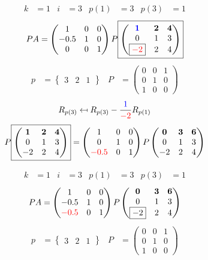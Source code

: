 \documentclass[pdf]{beamer}
\begin{document}
\begin{frame}{}\begin{align*} k &= 1 & i &= 3 & p(1) &= 3 & p(3) &= 1\end{align*} $$PA=\begin{pmatrix}1&0&0\\-0.5&1&0\\0&0&1\end{pmatrix} P \boxed{\begin{pmatrix}\mathbf{{\color{blue}1}}&\mathbf{2}&\mathbf{4}\\0&1&3\\\boxed{{\color{red}-2}}&2&4\end{pmatrix}} $$ \begin{align*} p&= \begin{Bmatrix}3&2&1\end{Bmatrix} & P&= \begin{pmatrix}0&0&1\\0&1&0\\1&0&0\end{pmatrix} \end{align*} $$R_{p(3)} \mapsfrom R_{p(3)} - \frac{{\color{blue}1}}{{\color{red}-2}} R_{p(1)}$$ $$ P \boxed{\begin{pmatrix}\mathbf{1}&\mathbf{2}&\mathbf{4}\\0&1&3\\-2&2&4\end{pmatrix}} = \begin{pmatrix}1&0&0\\0&1&0\\{\color{red}-0.5}&0&1\end{pmatrix} P \begin{pmatrix}\mathbf{0}&\mathbf{3}&\mathbf{6}\\0&1&3\\-2&2&4\end{pmatrix} $$\end{frame}
\begin{frame}{}\begin{align*} k &= 1 & i &= 3 & p(1) &= 3 & p(3) &= 1\end{align*}$$PA=\begin{pmatrix}1&0&0\\-0.5&1&0\\{\color{red}-0.5}&0&1\end{pmatrix} P \begin{pmatrix}\mathbf{0}&\mathbf{3}&\mathbf{6}\\0&1&3\\\boxed{-2}&2&4\end{pmatrix} $$\begin{align*} p&= \begin{Bmatrix}3&2&1\end{Bmatrix} & P&= \begin{pmatrix}0&0&1\\0&1&0\\1&0&0\end{pmatrix} \end{align*}\end{frame}
\end{document}
